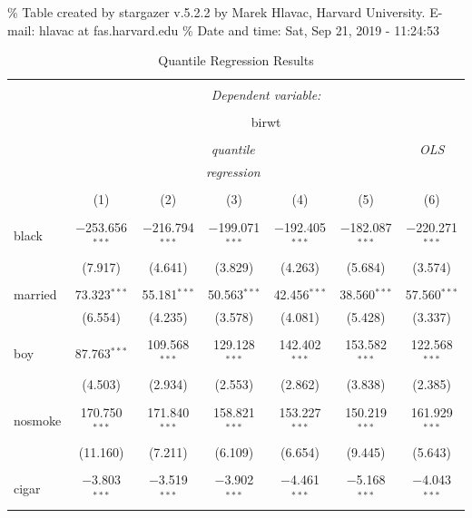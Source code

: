 \documentclass[]{book}
\begin{document}
\% Table created by stargazer v.5.2.2 by Marek Hlavac, Harvard
University. E-mail: hlavac at fas.harvard.edu \% Date and time: Sat, Sep
21, 2019 - 11:24:53

\begin{table}[!htbp] \centering 
  \caption{Quantile Regression Results} 
  \label{tab:} 
\begin{tabular}{@{\extracolsep{5pt}}lcccccc} 
\\[-1.8ex]\hline 
\hline \\[-1.8ex] 
 & \multicolumn{6}{c}{\textit{Dependent variable:}} \\ 
\cline{2-7} 
\\[-1.8ex] & \multicolumn{6}{c}{birwt} \\ 
\\[-1.8ex] & \multicolumn{5}{c}{\textit{quantile}} & \textit{OLS} \\ 
 & \multicolumn{5}{c}{\textit{regression}} & \textit{} \\ 
\\[-1.8ex] & (1) & (2) & (3) & (4) & (5) & (6)\\ 
\hline \\[-1.8ex] 
 black & $-$253.656$^{***}$ & $-$216.794$^{***}$ & $-$199.071$^{***}$ & $-$192.405$^{***}$ & $-$182.087$^{***}$ & $-$220.271$^{***}$ \\ 
  & (7.917) & (4.641) & (3.829) & (4.263) & (5.684) & (3.574) \\ 
  & & & & & & \\ 
 married & 73.323$^{***}$ & 55.181$^{***}$ & 50.563$^{***}$ & 42.456$^{***}$ & 38.560$^{***}$ & 57.560$^{***}$ \\ 
  & (6.554) & (4.235) & (3.578) & (4.081) & (5.428) & (3.337) \\ 
  & & & & & & \\ 
 boy & 87.763$^{***}$ & 109.568$^{***}$ & 129.128$^{***}$ & 142.402$^{***}$ & 153.582$^{***}$ & 122.568$^{***}$ \\ 
  & (4.503) & (2.934) & (2.553) & (2.862) & (3.838) & (2.385) \\ 
  & & & & & & \\ 
 nosmoke & 170.750$^{***}$ & 171.840$^{***}$ & 158.821$^{***}$ & 153.227$^{***}$ & 150.219$^{***}$ & 161.929$^{***}$ \\ 
  & (11.160) & (7.211) & (6.109) & (6.654) & (9.445) & (5.643) \\ 
  & & & & & & \\ 
 cigar & $-$3.803$^{***}$ & $-$3.519$^{***}$ & $-$3.902$^{***}$ & $-$4.461$^{***}$ & $-$5.168$^{***}$ & $-$4.043$^{***}$ \\ 

\end{tabular}
\end{table}
\end{document}
